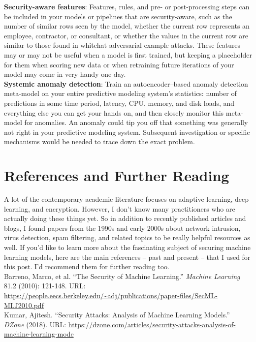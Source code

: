 \documentclass[fleqn]{article}
\begin{document}
\noindent\textbf{Security-aware features}: Features, rules, and pre- or post-processing steps can be included in your models or pipelines that are security-aware, such as the number of similar rows seen by the model, whether the current row represents an employee, contractor, or consultant, or whether the values in the current row are similar to those found in whitehat adversarial example attacks. These features may or may not be useful when a model is first trained, but keeping a placeholder for them when scoring new data or when retraining future iterations of your model may come in very handy one day.\\

\noindent\textbf{Systemic anomaly detection}: Train an autoencoder--based anomaly detection meta-model on your entire predictive modeling system's statistics: number of predictions in some time period, latency, CPU, memory, and disk loads, and everything else you can get your hands on, and then closely monitor this meta-model for anomalies. An anomaly could tip you off that something was generally not right in your predictive modeling system. Subsequent investigation or specific mechanisms would be needed to trace down the exact problem.\\

\section{References and Further Reading} \label{sec:ref}

A lot of the contemporary academic literature focuses on adaptive learning, deep learning, and encryption. However, I don't know many practitioners who are actually doing these things yet. So in addition to recently published articles and blogs, I found papers from the 1990s and early 2000s about network intrusion, virus detection, spam filtering, and related topics to be really helpful resources as well. If you'd like to learn more about the fascinating subject of securing machine learning models, here are the main references -- past and present -- that I used for this post. I'd recommend them for further reading too.\\

\noindent Barreno, Marco, et al. ``The Security of Machine Learning.'' \textit{Machine Learning} 81.2 (2010): 121-148. URL: \url{https://people.eecs.berkeley.edu/~adj/publications/paper-files/SecML-MLJ2010.pdf}\\

\noindent Kumar, Ajitesh. ``Security Attacks: Analysis of Machine Learning Models.'' \textit{DZone} (2018). URL: \url{https://dzone.com/articles/security-attacks-analysis-of-machine-learning-mode}\\
\end{document}
